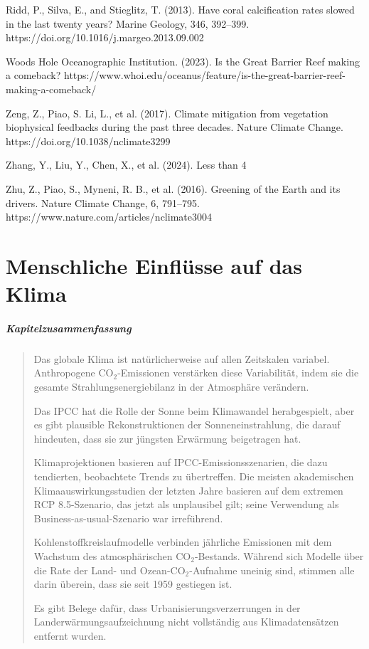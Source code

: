 \documentclass[12pt,paper=a4,DIV=12,parskip=never,chapterprefix=false,headings=standardclasses]{scrreprt}
\newcommand{\FigureNumbersBySection}{%
  \counterwithout{figure}{chapter}%
  \counterwithin{figure}{section}%
}
\begin{document}
Ridd, P., Silva, E., and Stieglitz, T. (2013). Have coral calcification rates slowed in the last twenty years? Marine Geology, 346, 392–399. https://doi.org/10.1016/j.margeo.2013.09.002

Woods Hole Oceanographic Institution. (2023). Is the Great Barrier Reef making a comeback? https://www.whoi.edu/oceanus/feature/is-the-great-barrier-reef-making-a-comeback/

Zeng, Z., Piao, S. Li, L., et al. (2017). Climate mitigation from vegetation biophysical feedbacks during the past three decades. Nature Climate Change. https://doi.org/10.1038/nclimate3299

Zhang, Y., Liu, Y., Chen, X., et al. (2024). Less than 4%

Zhu, Z., Piao, S., Myneni, R. B., et al. (2016). Greening of the Earth and its drivers. Nature Climate Change, 6, 791–795. https://www.nature.com/articles/nclimate3004
\endgroup

\FigureNumbersBySection
\chapter{Menschliche Einflüsse auf das Klima}
\paragraph{Kapitelzusammenfassung}
\begin{quote}
Das globale Klima ist natürlicherweise auf allen Zeitskalen variabel. Anthropogene CO$_2$-Emissionen verstärken diese Variabilität, indem sie die gesamte Strahlungsenergiebilanz in der Atmosphäre verändern.

Das IPCC hat die Rolle der Sonne beim Klimawandel herabgespielt, aber es gibt plausible Rekonstruktionen der Sonneneinstrahlung, die darauf hindeuten, dass sie zur jüngsten Erwärmung beigetragen hat.

Klimaprojektionen basieren auf IPCC-Emissionsszenarien, die dazu tendierten, beobachtete Trends zu übertreffen. Die meisten akademischen Klimaauswirkungsstudien der letzten Jahre basieren auf dem extremen RCP 8.5-Szenario, das jetzt als unplausibel gilt; seine Verwendung als Business-as-usual-Szenario war irreführend.

Kohlenstoffkreislaufmodelle verbinden jährliche Emissionen mit dem Wachstum des atmosphärischen CO$_2$-Bestands. Während sich Modelle über die Rate der Land- und Ozean-CO$_2$-Aufnahme uneinig sind, stimmen alle darin überein, dass sie seit 1959 gestiegen ist.

Es gibt Belege dafür, dass Urbanisierungsverzerrungen in der Landerwärmungsaufzeichnung nicht vollständig aus Klimadatensätzen entfernt wurden.
\end{quote}
\end{document}

